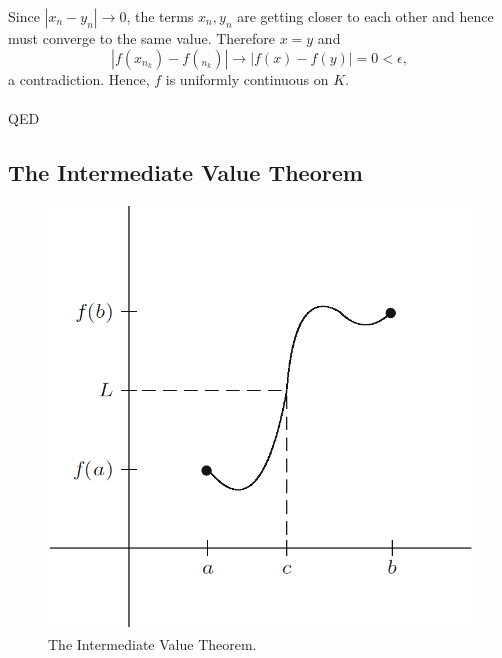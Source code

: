 \documentclass{article}
\begin{document}
            Since $|x_n-y_n|\to0$, the terms $x_n,y_n$ are getting closer to each other and hence must converge to the same value. Therefore $x=y$ and
            \begin{equation*}
                |f(x_{n_k})-f(_{n_k})| \to |f(x)-f(y)| = 0 < \epsilon,
            \end{equation*}
            a contradiction. Hence, $f$ is uniformly continuous on $K$.
            \\ \\
            QED
            
            \subsection{The Intermediate Value Theorem}
            
            \begin{figure}[ht!]
                \centering
                \includegraphics[width=0.55\linewidth]{figs/IVT.png}
                \caption{The Intermediate Value Theorem.}
                \label{ivt}
            \end{figure}
            
\end{document}

